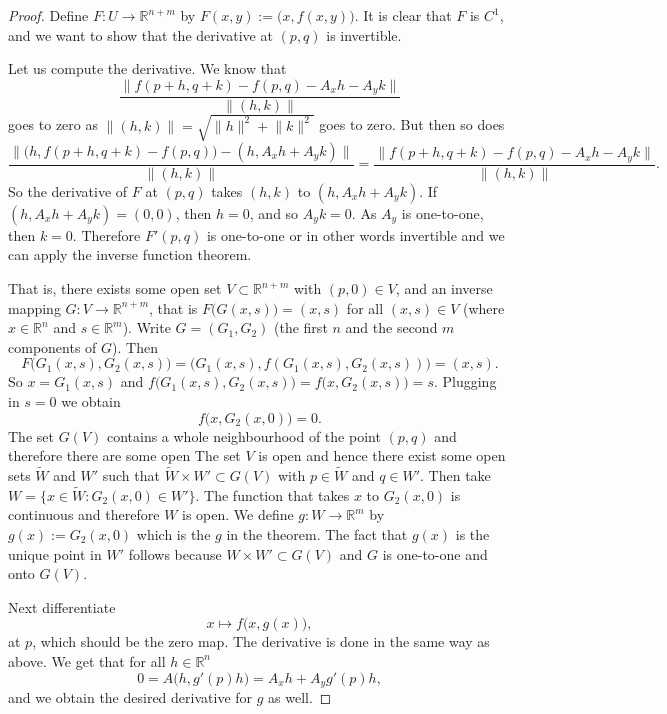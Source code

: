 \documentclass[12pt]{book}
\newcommand{\snorm}[1]{\lVert {#1} \rVert}
\newcommand{\R}{{\mathbb{R}}}
\theoremstyle{plain}
\theoremstyle{remark}
\theoremstyle{definition}
\theoremstyle{exercise}
\theoremstyle{example}
\begin{document}
\begin{proof}
Define $F \colon U \to \R^{n+m}$ by $F(x,y) := \bigl(x,f(x,y)\bigr)$.
It is clear that $F$ is $C^1$, and we want to show that the derivative
at $(p,q)$ is invertible.

Let us compute the derivative.  We know that
\begin{equation*}
\frac{\snorm{f(p+h,q+k) - f(p,q) - A_x h - A_y k}}{\snorm{(h,k)}}
\end{equation*}
goes to zero as $\snorm{(h,k)} = \sqrt{\snorm{h}^2+\snorm{k}^2}$ goes to zero.
But then so does
\begin{equation*}
\frac{\snorm{\bigl(h,f(p+h,q+k)-f(p,q)\bigr) - (h,A_x h+A_y
k)}}{\snorm{(h,k)}}
=
\frac{\snorm{f(p+h,q+k) - f(p,q) - A_x h - A_y k}}{\snorm{(h,k)}} .
\end{equation*}
So the derivative of $F$ at $(p,q)$ takes $(h,k)$ to $(h,A_x h+A_y k)$.  If 
$(h,A_x h+A_y k) = (0,0)$, then $h=0$, and so $A_y k = 0$.  As $A_y$ is
one-to-one, then $k=0$.  Therefore $F'(p,q)$ is one-to-one or in other
words invertible and we can apply the inverse function theorem.

That is, there exists some open set $V \subset \R^{n+m}$ with $(p,0) \in V$, and an inverse
mapping $G \colon V \to \R^{n+m}$, that is $F\bigl(G(x,s)\bigr) = (x,s)$ for
all $(x,s) \in V$ (where
$x \in \R^n$ and $s \in \R^m$).
Write $G = (G_1,G_2)$ (the first $n$ and the second $m$ components of $G$).
Then
\begin{equation*}
F\bigl(G_1(x,s),G_2(x,s)\bigr) = \bigl(G_1(x,s),f(G_1(x,s),G_2(x,s))\bigr)
= (x,s) .
\end{equation*}
So $x = G_1(x,s)$ and $f\bigl(G_1(x,s),G_2(x,s)\bigr) = f\bigl(x,G_2(x,s)\bigr) = s$.
Plugging in $s=0$ we obtain
\begin{equation*}
f\bigl(x,G_2(x,0)\bigr) = 0 .
\end{equation*}
The set $G(V)$ contains a whole neighbourhood of the point $(p,q)$
and therefore there are some open
The set $V$ is open and hence there exist some open sets
$\widetilde{W}$ and $W'$ such that $\widetilde{W} \times W' \subset G(V)$ with $p
\in \widetilde{W}$ and
$q \in W'$.
Then take $W = \{ x \in \widetilde{W} : G_2(x,0) \in W' \}$.
The function that takes $x$ to $G_2(x,0)$ is continuous and therefore $W$
is open.
We define
$g \colon W \to \R^m$ by $g(x) := G_2(x,0)$ which is the $g$ in the theorem.
The fact that $g(x)$ is the unique point in $W'$ follows because $W \times
W' \subset G(V)$ and $G$ is one-to-one and onto $G(V)$.

Next differentiate
\begin{equation*}
x\mapsto f\bigl(x,g(x)\bigr) ,
\end{equation*}
at $p$,
which should be the zero map.  The derivative is done in the same way as
above.  We get that for all $h \in \R^{n}$
\begin{equation*}
0 = A\bigl(h,g'(p)h\bigr) = A_xh + A_yg'(p)h ,
\end{equation*}
and we obtain the desired derivative for $g$ as well.
\end{proof}
\end{document}
